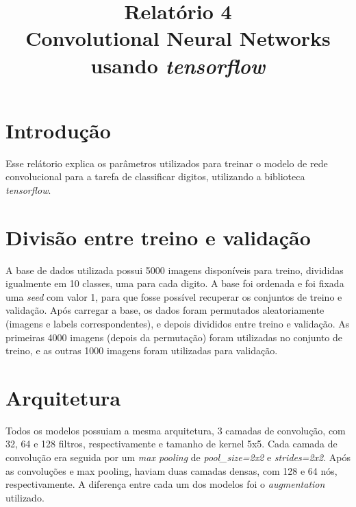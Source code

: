 \documentclass[conference]{IEEEtran}
\begin{document}
\title{%
  Relatório 4 \\
  \large Convolutional Neural Networks \\
    usando \textit{tensorflow}}

\author{
}


\maketitle

\section{Introdução}
Esse relátorio explica os parâmetros utilizados para treinar o modelo de rede convolucional para a tarefa de classificar digitos, utilizando a biblioteca \textit{tensorflow}.


\section{Divisão entre treino e validação}
A base de dados utilizada possui 5000 imagens disponíveis para treino, divididas igualmente em 10 classes, uma para cada digito. A base foi ordenada e foi fixada uma \textit{seed} com valor 1, para que fosse possível recuperar os conjuntos de treino e validação. Após carregar a base, os dados foram permutados aleatoriamente (imagens e labels correspondentes), e depois divididos entre treino e validação. As primeiras 4000 imagens (depois da permutação) foram utilizadas no conjunto de treino, e as outras 1000 imagens foram utilizadas para validação.

\section{Arquitetura}
Todos os modelos possuiam a mesma arquitetura, 3 camadas de convolução, com 32, 64 e 128 filtros, respectivamente e tamanho de kernel 5x5. Cada camada de convolução era seguida por um \textit{max pooling} de \textit{pool\_size=2x2} e \textit{strides=2x2}. Após as convoluções e max pooling, haviam duas camadas densas, com 128 e 64 nós, respectivamente. A diferença entre cada um dos modelos foi o \textit{augmentation} utilizado.
\end{document}

